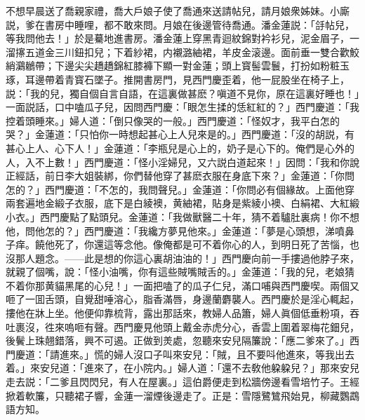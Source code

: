不想早晨送了喬親家禮，喬大戶娘子使了喬通來送請帖兒，請月娘衆姊妹。小廝説，爹在書房中睡哩，都不敢來問。月娘在後邊管待喬通。潘金蓮説：「㧱帖兒，等我問他去！」於是驀地進書房。潘金蓮上穿黑青迴紋錦對衿衫兒，泥金眉子，一溜㩟五道金三川鈕扣兒；下着紗裙，内襯潞紬裙，羊皮金滚邊。面前垂一雙合歡鮫綃鸂鶒帶；下邊尖尖趫趫錦紅膝褲下顯一對金蓮；頭上寳髻雲鬟，打扮如粉粧玉琢，耳邊帶着青寳石墜子。推開書房門，見西門慶歪着，他一屁股坐在椅子上，説：「我的兒，獨自個自言自語，在這裏做甚麽？嗔道不見你，原在這裏好睡也！」一面説話，口中嗑瓜子兒，因問西門慶：「眼怎生揉的恁紅紅的？」西門慶道：「我控着頭睡來。」婦人道：「倒只像哭的一般。」西門慶道：「怪奴才，我平白怎的哭？」金蓮道：「只怕你一時想起甚心上人兒來是的。」西門慶道：「沒的胡説，有甚心上人、心下人！」金蓮道：「李瓶兒是心上的，奶子是心下的。俺們是心外的人，入不上數！」西門慶道：「怪小淫婦兒，又六説白道起來！」因問：「我和你說正經話，前日李大姐裝綁，你們替他穿了甚麽衣服在身底下來？」金蓮道：「你問怎的？」西門慶道：「不怎的，我問聲兒。」金蓮道：「你問必有個緣故。上面他穿兩套遍地金緞子衣服，底下是白綾襖，黄紬裙，貼身是紫綾小襖、白絹裙、大紅緞小衣。」西門慶點了點頭兒。金蓮道：「我做獸醫二十年，猜不着驢肚裏病！你不想他，問他怎的？」西門慶道：「我纔方夢見他來。」金蓮道：「夢是心頭想，涕噴鼻子痒。饒他死了，你還這等念他。像俺都是可不着你心的人，到明日死了苦惱，也沒那人題念。——此是想的你這心裏胡油油的！」西門慶向前一手摟過他脖子來，就親了個嘴，說：「怪小油嘴，你有這些賊嘴賊舌的。」金蓮道：「我的兒，老娘猜不着你那黄貓黑尾的心兒！」一面把嗑了的瓜子仁兒，滿口哺與西門慶喫。兩個又咂了一囬舌頭，自覺甜唾溶心，脂香滿唇，身邊蘭麝襲人。西門慶於是淫心輒起，摟他在牀上坐。他便仰靠梳背，露出那話來，教婦人品簫，婦人眞個低垂粉項，吞吐裹沒，徃來嗚咂有聲。西門慶見他頭上戴金赤虎分心，香雲上圍着翠梅花鈿兒，後鬢上珠翹錯落，興不可遏。正做到羙處，忽聽來安兒隔簾說：「應二爹來了。」西門慶道：「請進來。」慌的婦人沒口子叫來安兒：「賊，且不要呌他進來，等我出去着。」來安兒道：「進來了，在小院内。」婦人道：「還不去敎他躱躱兒？」那來安兒走去説：「二爹且閃閃兒，有人在屋裏。」這伯爵便走到松牆傍邊看雪培竹子。王經掀着軟簾，只聽裙子響，金蓮一溜煙後邊走了。正是：雪隱鷺鷥飛始見，柳藏鸚鵡語方知。

